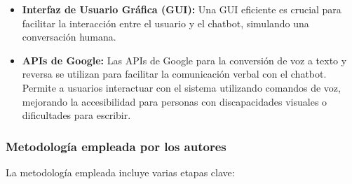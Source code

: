 \begin{itemize}
	\item \textbf{Interfaz de Usuario Gráfica (GUI):} Una GUI eficiente es crucial para facilitar la interacción entre el usuario y el chatbot, simulando una conversación humana.
	
	\item \textbf{APIs de Google:} Las APIs de Google para la conversión de voz a texto y reversa se utilizan para facilitar la comunicación verbal con el chatbot. Permite a usuarios interactuar con el sistema utilizando comandos de voz, mejorando la accesibilidad para personas con discapacidades visuales o dificultades para escribir.
\end{itemize}

\subsubsection{Metodología empleada por los autores}
	La metodología empleada incluye varias etapas clave:
	
